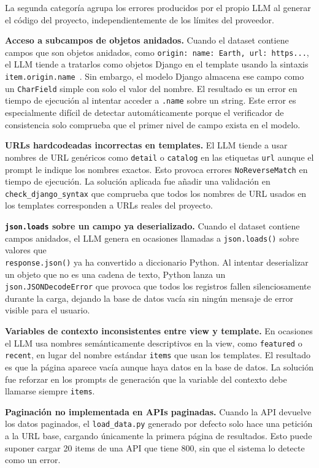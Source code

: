 La segunda categoría agrupa los errores producidos por el propio LLM al generar el código del proyecto, independientemente de los límites del proveedor.

\textbf{Acceso a subcampos de objetos anidados.} Cuando el dataset contiene campos que son objetos anidados, como \texttt{origin: {name: Earth, url: https...}}, el LLM tiende a tratarlos como objetos Django en el template usando la sintaxis \texttt{{{ item.origin.name }}}. Sin embargo, el modelo Django almacena ese campo como un \texttt{CharField} simple con solo el valor del nombre. El resultado es un error en tiempo de ejecución al intentar acceder a \texttt{.name} sobre un string. Este error es especialmente difícil de detectar automáticamente porque el verificador de consistencia solo comprueba que el primer nivel de campo exista en el modelo.

\textbf{URLs hardcodeadas incorrectas en templates.} El LLM tiende a usar nombres de URL genéricos como \texttt{detail} o \texttt{catalog} en las etiquetas \texttt{url} aunque el prompt le indique los nombres exactos. Esto provoca errores \texttt{NoReverseMatch} en tiempo de ejecución. La solución aplicada fue añadir una validación en \texttt{check\_django\_syntax} que comprueba que todos los nombres de URL usados en los templates corresponden a URLs reales del proyecto.

\textbf{\texttt{json.loads} sobre un campo ya deserializado.} Cuando el 
dataset contiene campos anidados, el LLM genera en ocasiones llamadas a 
\texttt{json.loads()} sobre valores que \\ \texttt{response.json()} ya ha 
convertido a diccionario Python. Al intentar deserializar un objeto que 
no es una cadena de texto, Python lanza un \texttt{json.JSONDecodeError} 
que provoca que todos los registros fallen silenciosamente durante la 
carga, dejando la base de datos vacía sin ningún mensaje de error visible 
para el usuario.

\textbf{Variables de contexto inconsistentes entre view y template.} En ocasiones el LLM usa nombres semánticamente descriptivos en la view, como \texttt{featured} o \texttt{recent}, en lugar del nombre estándar \texttt{items} que usan los templates. El resultado es que la página aparece vacía aunque haya datos en la base de datos. La solución fue reforzar en los prompts de generación que la variable del contexto debe llamarse siempre \texttt{items}.

\textbf{Paginación no implementada en APIs paginadas.} Cuando la API devuelve los datos paginados, el \texttt{load\_data.py} generado por defecto solo hace una petición a la URL base, cargando únicamente la primera página de resultados. Esto puede suponer cargar 20 items de una API que tiene 800, sin que el sistema lo detecte como un error.


